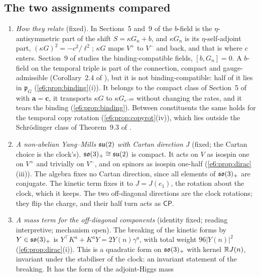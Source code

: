 \subsection{The two assignments compared}
\label{e6:sec:compare}

\begin{remark}
\label{e6:rem:compare}
\begin{enumerate}[label=(\alph*),leftmargin=2.2em]
\item \emph{How they relate} (fixed). In Sections~5 and~9 of \cite{RE} the $b$-field is the $\eta$-antisymmetric part of the shift $S=\kappa G_n+b$, and
$\kappa G_n$ is its $\eta$-self-adjoint part, $(\kappa G)^2=-c^2/\ell^2$; $\kappa G$ maps $V^+$ to $V^-$ and back, and that is where $c$ enters. Section~9 of
\cite{RE} studies the binding-compatible fields, $[b,G_n]=0$. A $b$-field on the temporal triple is part of the connection, compact and
gauge-admissible (Corollary~2.4 of \cite{ES17}), but it is not binding-compatible: half of it lies in $\mathfrak p_G$
(\cref{e6:prop:binding}(i)). It belongs to the compact class of Section~5 of \cite{RE} with $\mathbf a=\mathbf c$, it transports $\kappa G$ to
$\kappa G_{e^{-\theta R}}$ without changing the rates, and it tears the binding (\cref{e6:prop:binding}). Between constituents the same holds for the
temporal copy rotation (\cref{e6:prop:copyrot}(iv)), which lies outside the Schr\"odinger class of Theorem~9.3 of \cite{RE}.
\item \emph{A non-abelian Yang--Mills $\mathfrak{su}(2)$ with Cartan direction $J$} (fixed; the Cartan choice is the clock's). $\mathfrak{so}(3)_+\cong\mathfrak{su}(2)$ is compact. It acts on
$V$ as isospin one on $V^+$ and trivially on $V^-$, and on spinors as isospin one-half (\cref{e6:prop:dirac}(iii)). The algebra fixes no Cartan direction,
since all elements of $\mathfrak{so}(3)_+$ are conjugate. The kinetic term fixes it to $J=J(e_1)$, the rotation about the clock, which it keeps. The two
off-diagonal directions are the clock rotations; they flip the charge, and their half turn acts as $\mathsf{CP}$.
\item \emph{A mass term for the off-diagonal components} (identity fixed; reading interpretive; mechanism open). The breaking of the kinetic forms
by $Y\in\mathfrak{so}(3)_+$ is $Y^{\!\top}K^a+K^aY=2Y(n)\gamma^a$, with total weight $96|Y(n)|^2$ (\cref{e6:prop:dirac}(i)). This is a quadratic form on $\mathfrak{so}(3)_+$ with
kernel $\mathbb{R} J(n)$, invariant under the stabiliser of the clock: an invariant statement of the breaking. It has the form of the adjoint-Higgs mass

\end{enumerate}
\end{remark}
